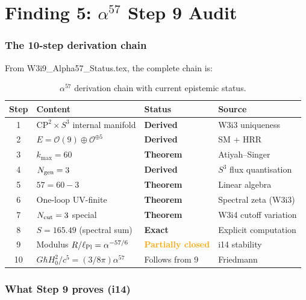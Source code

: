 \documentclass[11pt]{article}
\newcommand{\alphafine}{\alpha}
\newcommand{\lPl}{\ell_{\rm Pl}}
\begin{document}
\part{Finding 5: $\alpha^{57}$ Step 9 Audit}
\label{part:alpha57}

\section{The 10-step derivation chain}

From W3i9\_Alpha57\_Status.tex, the complete chain is:

\begin{table}[H]
\centering
\caption{$\alpha^{57}$ derivation chain with current epistemic status.}
\begin{tabular}{@{}clll@{}}
\toprule
Step & Content & Status & Source \\
\midrule
1 & $\text{CP}^2 \times S^3$ internal manifold & \textbf{Derived} & W3i3 uniqueness \\
2 & $E = \mathcal{O}(9) \oplus \mathcal{O}^{\oplus 5}$ & \textbf{Derived} & SM + HRR \\
3 & $k_{\max} = 60$ & \textbf{Theorem} & Atiyah--Singer \\
4 & $N_{\rm gen} = 3$ & \textbf{Derived} & $S^3$ flux quantisation \\
5 & $57 = 60 - 3$ & \textbf{Theorem} & Linear algebra \\
6 & One-loop UV-finite & \textbf{Theorem} & Spectral zeta (W3i3) \\
7 & $N_{\rm cut} = 3$ special & \textbf{Theorem} & W3i4 cutoff variation \\
8 & $S = 165.49$ (spectral sum) & \textbf{Exact} & Explicit computation \\
9 & Modulus $R/\lPl = \alphafine^{-57/6}$ & \textcolor{orange}{\textbf{Partially closed}} & i14 stability \\
10 & $G\hbar H_0^2/c^5 = (3/8\pi)\alphafine^{57}$ & Follows from 9 & Friedmann \\
\bottomrule
\end{tabular}
\end{table}

\section{What Step 9 proves (i14)}
\end{document}
